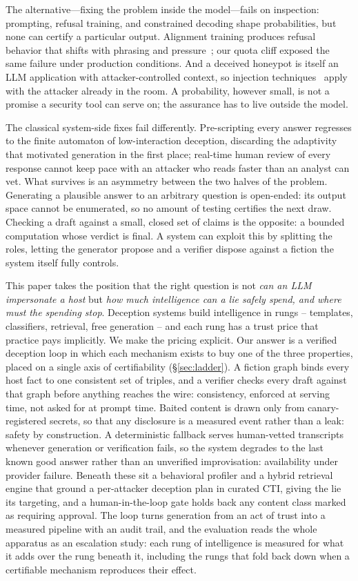 The alternative---fixing the problem inside the model---fails on
inspection: prompting, refusal training, and constrained decoding shape
probabilities, but none can certify a particular output. Alignment
training produces refusal behavior that shifts with phrasing and
pressure~\cite{ganguli2022,bai2022}; our quota cliff exposed the same
failure under production conditions. And a deceived honeypot is itself an
LLM application with attacker-controlled context, so injection
techniques~\cite{greshake2023} apply with the attacker already in the
room. A probability, however small, is not a promise a security tool can
serve on; the assurance has to live outside the model.

The classical system-side fixes fail differently. Pre-scripting every
answer regresses to the finite automaton of low-interaction deception,
discarding the adaptivity that motivated generation in the first place;
real-time human review of every response cannot keep pace with an
attacker who reads faster than an analyst can vet. What survives is an
asymmetry between the two halves of the problem. Generating a plausible
answer to an arbitrary question is open-ended: its output space cannot
be enumerated, so no amount of testing certifies the next draw.
Checking a draft against a small, closed set of claims is the opposite:
a bounded computation whose verdict is final. A system can exploit this
by splitting the roles, letting the generator propose and a verifier
dispose against a fiction the system itself fully controls.

This paper takes the position that the right question is not
\emph{can an LLM impersonate a host} but \emph{how much intelligence can
a lie safely spend, and where must the spending stop}. Deception systems
build intelligence in rungs -- templates, classifiers, retrieval, free
generation -- and each rung has a trust price that practice pays
implicitly. We make the pricing explicit. Our answer is a verified
deception loop in which
each mechanism exists to buy one of the three properties, placed on a
single axis of certifiability (\S\ref{sec:ladder}). A fiction graph
binds every host fact to one consistent set of triples, and a verifier
checks every draft against that graph before anything reaches the wire:
consistency, enforced at serving time, not asked for at prompt time.
Baited content is drawn only from canary-registered secrets, so that any
disclosure is a measured event rather than a leak: safety by
construction. A deterministic fallback serves human-vetted transcripts
whenever generation or verification fails, so the system degrades to the
last known good answer rather than an unverified improvisation:
availability under provider failure. Beneath these sit a behavioral
profiler and a hybrid retrieval engine that ground a per-attacker
deception plan in curated CTI, giving the lie its targeting, and a
human-in-the-loop gate holds back any content class marked as requiring
approval. The loop turns generation from an act of trust into a measured
pipeline with an audit trail, and the evaluation reads the whole
apparatus as an escalation study: each rung of intelligence is measured
for what it adds over the rung beneath it, including the rungs that fold
back down when a certifiable mechanism reproduces their effect.


